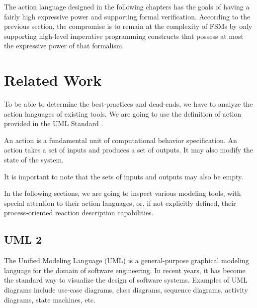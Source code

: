 The action language designed in the following chapters has the goals of having a fairly high expressive power and supporting formal verification. According to the previous section, the compromise is to remain at the complexity of FSMs by only supporting high-level imperative programming constructs that possess at most the expressive power of that formalism.

\section{Related Work} \label{section_background_comparison}
To be able to determine the best-practices and dead-ends, we have to analyze the action languages of existing tools. We are going to use the definition of action provided in the UML Standard \cite{UMLStandard251}.
\begin{definition}[Action] \label{definition_action}
	An action is a fundamental unit of computational behavior specification. An action takes a set of inputs and produces a set of outputs. It may also modify the state of the system.
	
	It is important to note that the sets of inputs and outputs may also be empty.
\end{definition}

In the following sections, we are going to inspect various modeling tools, with special attention to their action languages, or, if not explicitly defined, their process-oriented reaction description capabilities.

\subsection{UML 2} \label{subsection_background_comparison_UML}
The Unified Modeling Language (UML) \cite{UMLStandard251} is a general-purpose graphical modeling language for the domain of software engineering. In recent years, it has become the standard way to visualize the design of software systems. Examples of UML diagrams include use-case diagrams, class diagrams, sequence diagrams, activity diagrams, state machines, etc.

